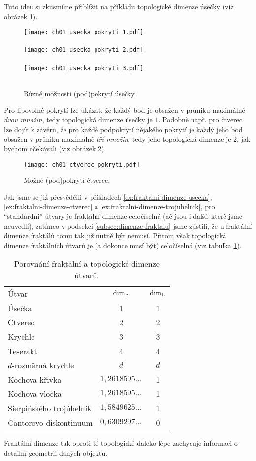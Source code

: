 Tuto ideu si zkusmíme přiblížit na příkladu topologické dimenze úsečky (viz obrázek \ref{fig:usecka-podpokryti}).
\begin{figure}[h]
    \centering
    \texttt{[image: ch01\_usecka\_pokryti\_1.pdf]}\\\qquad\\
    \texttt{[image: ch01\_usecka\_pokryti\_2.pdf]}\\\qquad\\
    \texttt{[image: ch01\_usecka\_pokryti\_3.pdf]}\\\qquad\\
    \caption{Různé možnosti (pod)pokrytí úsečky.}
    \label{fig:usecka-podpokryti}
\end{figure}
Pro libovolné pokrytí lze ukázat, že každý bod je obsažen v průniku maximálně \emph{dvou množin}, tedy topologická dimenze úsečky je $1$. Podobně např. pro čtverec lze dojít k závěru, že pro každé podpokrytí nějakého pokrytí je každý jeho bod obsažen v průniku maximálně \emph{tří množin}, tedy jeho topologická dimenze je 2, jak bychom očekávali (viz obrázek \ref{fig:ctverec-podpokryti}).
\begin{figure}[h]
    \centering
    \texttt{[image: ch01\_ctverec\_pokryti.pdf]}
    \caption{Možné (pod)pokrytí čtverce.}
    \label{fig:ctverec-podpokryti}
\end{figure}
Jak jsme se již přesvědčili v příkladech \ref{ex:fraktalni-dimenze-usecka}, \ref{ex:fraktalni-dimenze-ctverec} a \ref{ex:fraktalni-dimenze-trojuhelnik}, pro ``standardní'' útvary je fraktální dimenze celočíselná (ač jsou i další, které jsme neuvedli), zatímco v podsekci \ref{subsec:dimenze-fraktalu} jsme zjistili, že u fraktální dimenze fraktálů tomu tak již nutně být nemusí. Přitom však topologická dimenze fraktálních útvarů je (a dokonce musí být) celočíselná (viz tabulka \ref{table:fraktalni-topologicka-dimenze}).
\begin{table}[h]
    \begin{tabular}{lcc}
    Útvar                    & $\operatorname{dim_B}$            & $\operatorname{dim_L}$ \\
    Úsečka                   & 1                  & 1       \\
    Čtverec                  & 2                  & 2       \\
    Krychle                  & 3                  & 3       \\
    Teserakt                 & 4                  & 4       \\
    $d$-rozměrná krychle     & $d$                & $d$     \\
    Kochova křivka           & $1{,}2618595\dots$ & 1       \\
    Kochova vločka           & $1{,}2618595\dots$ & 1       \\
    Sierpińského trojúhelník & $1{,}5849625\dots$ & 1       \\
    Cantorovo diskontinuum   & $0{,}6309297\dots$ & 0      
    \end{tabular}
    \caption{Porovnání fraktální a topologické dimenze útvarů.}
    \label{table:fraktalni-topologicka-dimenze}
\end{table}
Fraktální dimenze tak oproti té topologické daleko lépe zachycuje informaci o detailní geometrii daných objektů.